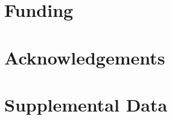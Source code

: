\documentclass[utf8]{article}
\begin{document}
	
	
	

	
    
    

	\section*{Funding}
	\section*{Acknowledgements}

	\section*{Supplemental Data}

	
	
\end{document}
